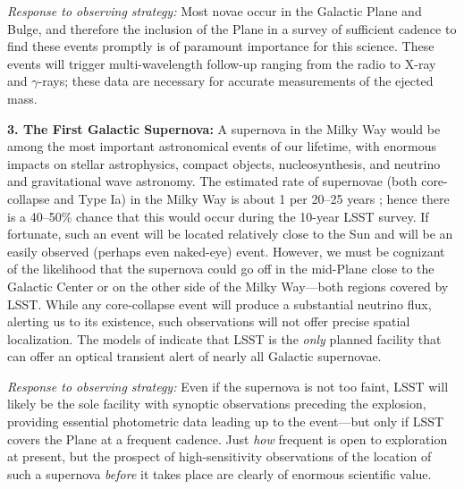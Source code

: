 {\it Response to observing strategy:} Most novae occur in the Galactic
Plane and Bulge, and therefore the inclusion of the Plane in a survey
of sufficient cadence to find these events promptly is of paramount
importance for this science. These events will trigger
multi-wavelength follow-up ranging from the radio to X-ray and
$\gamma$-rays; these data are necessary for accurate measurements of
the ejected mass.

{\bf 3. The First Galactic Supernova:} A supernova in the Milky Way
would be among the most important astronomical events of our lifetime,
with enormous impacts on stellar astrophysics, compact objects,
nucleosynthesis, and neutrino and gravitational wave astronomy. The
estimated rate of supernovae (both core-collapse and Type Ia) in the
Milky Way is about 1 per 20--25 years \citep{2013ApJ...778..164A}; hence there
is a 40--50\% chance that this would occur during the 10-year LSST
survey. If fortunate, such an event will be located relatively close
to the Sun and will be an easily observed (perhaps even naked-eye)
event. However, we must be cognizant of the likelihood that the
supernova could go off in the mid-Plane close to the Galactic Center
or on the other side of the Milky Way---both regions covered by
LSST. While any core-collapse event will produce a substantial
neutrino flux, alerting us to its existence, such observations will
not offer precise spatial localization. The models of \citet{2013ApJ...778..164A}
indicate that LSST is the \emph{only} planned facility that
can offer an optical transient alert of nearly all Galactic
supernovae.

{\it Response to observing strategy:} Even if the supernova is not too
faint, LSST will likely be the sole facility with synoptic
observations preceding the explosion, providing essential photometric
data leading up to the event---but only if LSST covers the Plane at a
frequent cadence. Just {\it how} frequent is open to exploration at
present, but the prospect of high-sensitivity observations of the
location of such a supernova {\it before} it takes place are clearly
of enormous scientific value. 



